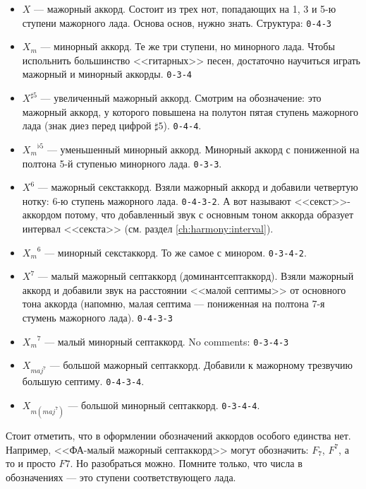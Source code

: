 \begin{itemize}
    \item $X$ --- мажорный аккорд. Состоит из трех нот, попадающих на 1, 3 и 5-ю ступени мажорного лада. Основа основ, нужно знать. Структура: \texttt{0-4-3}
    \item $X_m$ --- минорный аккорд. Те же три ступени, но минорного лада. Чтобы испольнить большинство <<гитарных>> песен, достаточно научиться играть мажорный и минорный аккорды. \texttt{0-3-4}

    \item $X^{\sharp 5}$ --- увеличенный мажорный аккорд. Смотрим на обозначение: это мажорный аккорд, у которого повышена на полутон пятая ступень мажорного лада (знак диез перед цифрой $\sharp 5$). \texttt{0-4-4}.
    \item ${X_m}^{\flat 5}$ --- уменьшенный минорный аккорд. Минорный аккорд с пониженной на полтона 5-й ступенью минорного лада. \texttt{0-3-3}.

    \item $X^6$ --- мажорный секстаккорд. Взяли мажорный аккорд и добавили четвертую нотку: 6-ю ступень мажорного лада. \texttt{0-4-3-2}. А вот называют <<секст>>-аккордом потому, что добавленный звук с основным тоном аккорда образует интервал <<секста>> (см. раздел \ref{ch:harmony:interval}).
    \item ${X_m}^6$ --- минорный секстаккорд. То же самое с минором. \texttt{0-3-4-2}.

    \item $X^7$ --- малый мажорный септаккорд (доминантсептаккорд). Взяли мажорный аккорд и добавили звук на расстоянии <<малой септимы>> от основного тона аккорда (напомню, малая септима --- пониженная на полтона 7-я стумень мажорного лада). \texttt{0-4-3-3}
    \item ${X_m}^7$ --- малый минорный септаккорд. No comments: \texttt{0-3-4-3}

    \item $X_{maj^7}$ --- большой мажорный септаккорд. Добавили к мажорному трезвучию большую септиму. \texttt{0-4-3-4}.
    \item $X_{m(maj^7)}$ --- большой минорный септаккорд. \texttt{0-3-4-4}.
\end{itemize}

Стоит отметить, что в оформлении обозначений аккордов особого единства нет. Например, <<ФА-малый мажорный септаккорд>> могут обозначить: $F_7$, $F^7$, а то и просто $F7$. Но разобраться можно. Помните только, что числа в обозначениях --- это ступени соответствующего лада.

